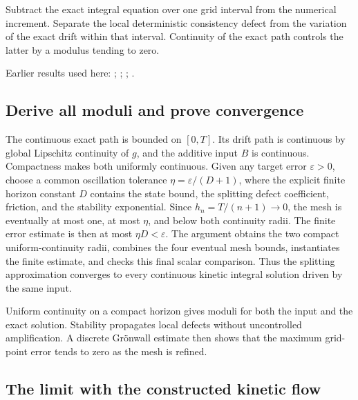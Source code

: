 \documentclass[11pt,a4paper]{report}
\begin{document}
Subtract the exact integral equation over one grid interval from the numerical increment. Separate the local deterministic consistency defect from the variation of the exact drift within that interval. Continuity of the exact path controls the latter by a modulus tending to zero.



Earlier results used here: \cite[Section~3.11.1]{LangevinLean2026ULASC}; \cite[Section~3.11.3]{LangevinLean2026ULASC}; \cite[Section~3.16.4]{LangevinLean2026ULASC}; \cite[Section~3.16.5]{LangevinLean2026ULASC}.
\subsection{\texorpdfstring{Derive all moduli and prove convergence}{Derive all moduli and prove convergence}}
\label{report-step-KineticLangevin-KineticSplittingConvergence-lean-3}


The continuous exact path is bounded on \([0,T]\). Its drift path is continuous by global Lipschitz continuity of \(g\), and the additive input \(B\) is continuous. Compactness makes both uniformly continuous. Given any target error \(\varepsilon>0\), choose a common oscillation tolerance \(\eta=\varepsilon/(D+1)\), where the explicit finite horizon constant \(D\) contains the state bound, the splitting defect coefficient, friction, and the stability exponential. Since \(h_n=T/(n+1)\to0\), the mesh is eventually at most one, at most \(\eta\), and below both continuity radii. The finite error estimate is then at most \(\eta D<\varepsilon\). The argument obtains the two compact uniform-continuity radii, combines the four eventual mesh bounds, instantiates the finite estimate, and checks this final scalar comparison. Thus the splitting approximation converges to every continuous kinetic integral solution driven by the same input.



Uniform continuity on a compact horizon gives moduli for both the input and the exact solution. Stability propagates local defects without uncontrolled amplification. A discrete Grönwall estimate then shows that the maximum grid-point error tends to zero as the mesh is refined.

\subsection{\texorpdfstring{The limit with the constructed kinetic flow}{The limit with the constructed kinetic flow}}
\label{report-step-KineticLangevin-KineticSplittingConvergence-lean-4}
\end{document}
